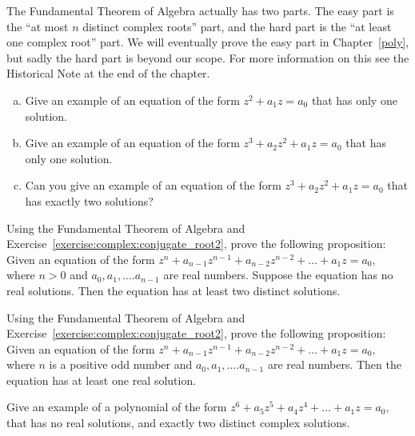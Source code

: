 The Fundamental Theorem of Algebra actually has two parts. The easy part is the ``at most $n$ distinct complex roots'' part, and the hard part is the ``at least one complex root'' part. We will eventually prove the easy part in Chapter~\ref{poly}, but sadly the hard part is beyond our scope. For more information on this see the Historical Note at the end of the chapter.

\begin{exercise}{70}
\begin{enumerate}[(a)]
\item
Give an example of an equation of the form $z^2 + a_1z = a_0$ that has only one solution.
\item
Give an example of an equation of the form $z^3 + a_2z^2 + a_1 z = a_0$ that has only one solution.
\item
Can you give an example of an equation of the form $z^3 + a_2z^2 + a_1 z = a_0$ that has exactly two solutions?
\end{enumerate}
\end{exercise}


\begin{exercise}{72}
Using the Fundamental Theorem of Algebra and Exercise~\ref{exercise:complex:conjugate_root2}, prove the following proposition: 
Given an equation of the form $z^n + a_{n-1}z^{n-1} + a_{n-2} z^{n-2} + \ldots + a_1 z =a_0,$ where $n>0$ and $a_0, a_1, \ldots. a_{n-1}$ are real numbers. Suppose the equation has no real solutions. Then the equation has at least two distinct solutions.
\end{exercise}

\begin{exercise}{72}
Using the Fundamental Theorem of Algebra and Exercise~\ref{exercise:complex:conjugate_root2}, prove the following proposition: 
Given an equation of the form $z^n + a_{n-1}z^{n-1} + a_{n-2} z^{n-2} + \ldots + a_1 z =a_0,$ where $n$ is a positive odd number and $a_0, a_1, \ldots. a_{n-1}$ are real numbers.  Then the equation has at least one real solution.
\end{exercise}


\begin{exercise}{}
Give an example of a polynomial of the form  $z^6 + a_{5}z^{5} + a_{4} z^{4} + \ldots + a_1 z =a_0,$ that has no real solutions, and exactly two distinct complex solutions.
\end{exercise}


\histhead
 
 

